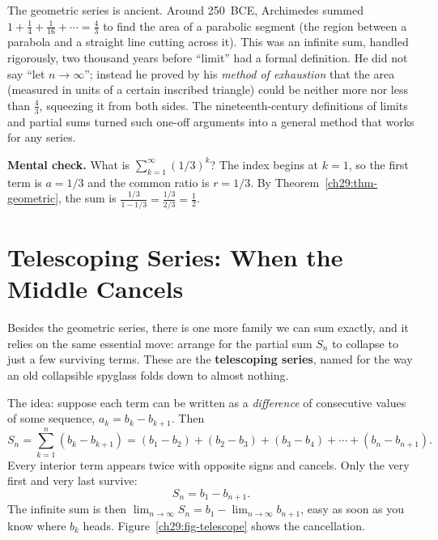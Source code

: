 \begin{connectionbox}
The geometric series is ancient. Around 250~BCE, Archimedes summed $1 + \tfrac14 + \tfrac{1}{16} + \cdots = \tfrac43$ to find the area of a parabolic segment (the region between a parabola and a straight line cutting across it). This was an infinite sum, handled rigorously, two thousand years before ``limit'' had a formal definition. He did not say ``let $n \to \infty$''; instead he proved by his \emph{method of exhaustion} that the area (measured in units of a certain inscribed triangle) could be neither more nor less than $\tfrac43$, squeezing it from both sides. The nineteenth-century definitions of limits and partial sums turned such one-off arguments into a general method that works for any series.
\end{connectionbox}

\begin{recoverybox}
\textbf{Mental check.} What is $\sum_{k=1}^\infty (1/3)^k$? The index begins at $k=1$, so the first term is $a = 1/3$ and the common ratio is $r = 1/3$. By Theorem~\ref{ch29:thm-geometric}, the sum is $\frac{1/3}{1 - 1/3} = \frac{1/3}{2/3} = \frac{1}{2}$.
\end{recoverybox}

\section{Telescoping Series: When the Middle Cancels}
\label{ch29:telescoping}

Besides the geometric series, there is one more family we can sum exactly, and it relies on the same essential move: arrange for the partial sum $S_n$ to collapse to just a few surviving terms. These are the \textbf{telescoping series}, named for the way an old collapsible spyglass folds down to almost nothing.

The idea: suppose each term can be written as a \emph{difference} of consecutive values of some sequence, $a_k = b_k - b_{k+1}$. Then
\[
S_n = \sum_{k=1}^n (b_k - b_{k+1}) = (b_1 - b_2) + (b_2 - b_3) + (b_3 - b_4) + \cdots + (b_n - b_{n+1}).
\]
Every interior term appears twice with opposite signs and cancels. Only the very first and very last survive:
\[
S_n = b_1 - b_{n+1}.
\]
The infinite sum is then $\lim_{n\to\infty} S_n = b_1 - \lim_{n\to\infty} b_{n+1}$, easy as soon as you know where $b_k$ heads. Figure~\ref{ch29:fig-telescope} shows the cancellation.

